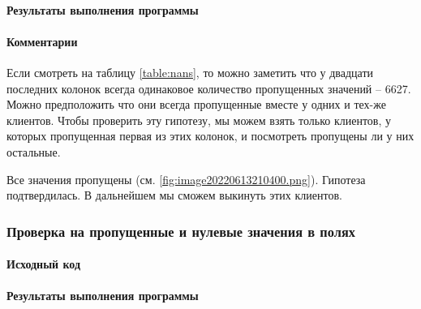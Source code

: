 \documentclass[12pt,a4paper]{article}
\begin{document}
  \paragraph*{Результаты выполнения программы}

  \paragraph*{Комментарии}
  \label{sec:nans}
  Если смотреть на таблицу \ref{table:nans}, то можно заметить что у двадцати последних
  колонок всегда одинаковое количество пропущенных значений -- 6627.
  Можно предположить что они всегда пропущенные вместе у одних и тех-же
  клиентов. Чтобы проверить эту гипотезу, мы можем взять только клиентов,
  у которых пропущенная первая из этих колонок, и посмотреть пропущены ли
  у них остальные.

  Все значения пропущены (см. \autoref{fig:image20220613210400.png}).
  Гипотеза подтвердилась. В дальнейшем мы сможем выкинуть этих клиентов.

  \subsubsection{Проверка на пропущенные и нулевые значения в полях}
  \paragraph*{Исходный код}
\begin{Shaded}
\begin{Highlighting}[]
\OperatorTok{=}\NormalTok{ data[}\OperatorTok{\textasciitilde{}}\NormalTok{data[cols\_sparse[}\NormalTok{]].isna()]}
\OperatorTok{=}\NormalTok{()}
\NormalTok{nan\_sum[nan\_sum }\OperatorTok{!=} \NormalTok{]}
\end{Highlighting}
\end{Shaded}

  \paragraph*{Результаты выполнения программы}
\end{document}
